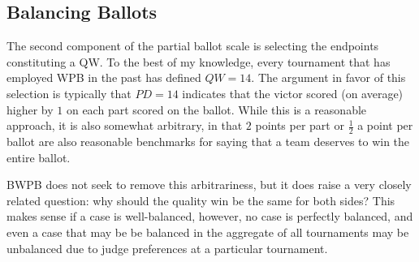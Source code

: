 \documentclass{article}
\begin{document}
\subsection{Balancing Ballots}
\label{balancingBallots}
The second component of the partial ballot scale is selecting the endpoints constituting a QW.  To the best of my knowledge, every tournament that has employed WPB in the past has defined $QW=14$.  The argument in favor of this selection is typically that $PD=14$ indicates that the victor scored (on average) higher by $1$ on each part scored on the ballot.  While this is a reasonable approach, it is also somewhat arbitrary, in that $2$ points per part or $\frac{1}{2}$ a point per ballot are also reasonable benchmarks for saying that a team deserves to win the entire ballot.

BWPB does not seek to remove this arbitrariness, but it does raise a very closely related question:  why should the quality win be the same for both sides?  This makes sense if a case is well-balanced, however, no case is perfectly balanced, and even a case that may be be balanced in the aggregate of all tournaments may be unbalanced due to judge preferences at a particular tournament.
\end{document}
